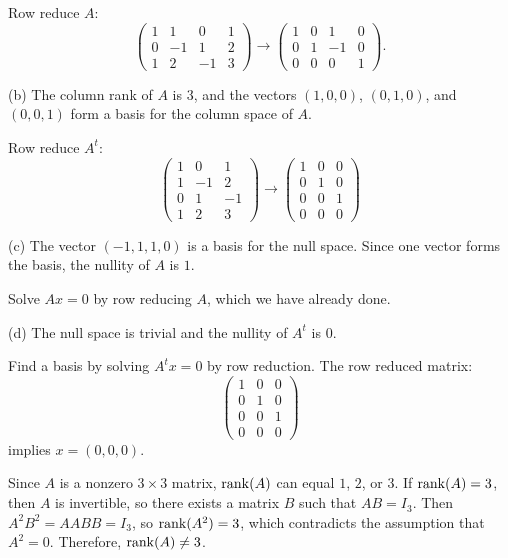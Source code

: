 \soln Row reduce $A$:
\[
\left(\begin{array}{rrrr} 1 & 1 & 0 & 1 \\ 0 & -1 & 1 & 2 \\1 & 2
& -1 & 3 \end{array}\right) \longrightarrow \left(\begin{array}{rrrr}
1 & 0 & 1 & 0 \\ 0 & 1 & -1 & 0 \\0 & 0 & 0 & 1 \end{array}\right).
\]

(b) \ans The column rank of $A$ is $3$, and the vectors $(1,0,0)$,
$(0,1,0)$, and $(0,0,1)$ form a basis for the column space of $A$.

\soln Row reduce $A^t$:
\[
\left(\begin{array}{rrr} 1 & 0 & 1 \\ 1 & -1 & 2 \\ 0 & 1 & -1
\\ 1 & 2 & 3 \end{array}\right) \longrightarrow \left(\begin{array}{rrr}
1 & 0 & 0 \\ 0 & 1 & 0 \\ 0 & 0 & 1 \\ 0 & 0 & 0 \end{array}\right)
\]

(c) \ans The vector $(-1,1,1,0)$ is a basis for the null space.  Since one
vector forms the basis, the nullity of $A$ is $1$.  

\soln Solve $Ax = 0$ by row reducing $A$, which we have already done.

(d) \ans The null space is trivial and the nullity of $A^t$ is $0$.

\soln Find a basis by solving $A^tx = 0$ by row reduction.  The row
reduced matrix:
\[
\left(\begin{array}{rrr} 1 & 0 & 0 \\ 0 & 1 & 0 \\ 0 & 0 & 1
\\ 0 & 0 & 0 \end{array}\right)
\]
implies $x = (0,0,0)$.


Since $A$ is a nonzero $3 \times 3$ matrix, ${\rm rank}(A)$ can equal $1$,
$2$, or $3$.  If ${\rm rank}(A) = 3$, then $A$ is invertible, so there
exists a matrix $B$ such that $AB = I_3$.  Then $A^2B^2 = AABB = I_3$,
so ${\rm rank}(A^2) = 3$, which contradicts the assumption that $A^2 = 0$.
Therefore, ${\rm rank}(A) \neq 3$.

